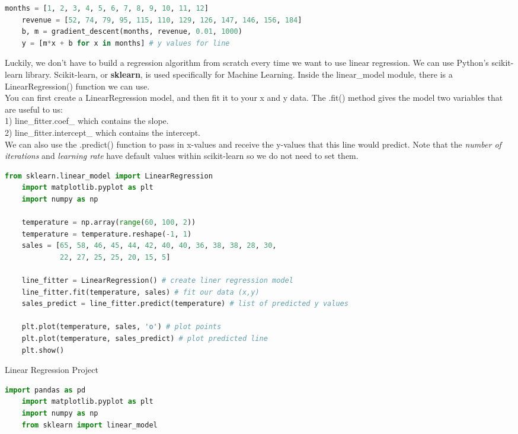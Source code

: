 \documentclass[11pt, a4paper]{article}
\begin{document}
\begin{spacing}{1.1}
\begin{lstlisting}[language=Python]
	months = [1, 2, 3, 4, 5, 6, 7, 8, 9, 10, 11, 12]
	revenue = [52, 74, 79, 95, 115, 110, 129, 126, 147, 146, 156, 184]
	b, m = gradient_descent(months, revenue, 0.01, 1000)
	y = [m*x + b for x in months] # y values for line \end{lstlisting} \newpage
	\noindent Luckily, we don’t have to build a regression algorithm from scratch every time we want to use linear regression. We can use Python’s scikit-learn library. Scikit-learn, or \textbf{sklearn}, is used specifically for Machine Learning. Inside the linear\_model module, there is a LinearRegression() function we can use. \vspace*{1mm} \\
	You can first create a LinearRegression model, and then fit it to your x and y data. The .fit() method gives the model two variables that are useful to us: \vspace*{.5mm} \\	
	\hspace*{2mm} 1) line\_fitter.coef\_ which contains the slope. \\
	\hspace*{2mm} 2) line\_fitter.intercept\_ which contains the intercept. \vspace*{1.5mm} \\
	We can also use the .predict() function to pass in x-values and receive the y-values that this line would predict. Note that the \textit{number of iterations} and \textit{learning rate} have default values within scikit-learn so we do not need to set them.
	\begin{lstlisting}[language=Python]
	from sklearn.linear_model import LinearRegression
	import matplotlib.pyplot as plt
	import numpy as np
	
	temperature = np.array(range(60, 100, 2))
	temperature = temperature.reshape(-1, 1)
	sales = [65, 58, 46, 45, 44, 42, 40, 40, 36, 38, 38, 28, 30, 
	         22, 27, 25, 25, 20, 15, 5]
	
	line_fitter = LinearRegression() # create liner regression model
	line_fitter.fit(temperature, sales) # fit our data (x,y)
	sales_predict = line_fitter.predict(temperature) # list of predicted y values
	
	plt.plot(temperature, sales, 'o') # plot points
	plt.plot(temperature, sales_predict) # plot predicted line
	plt.show() \end{lstlisting}\vspace*{1mm}
	Linear Regression Project 
	\begin{lstlisting}[language=Python]
	import pandas as pd
	import matplotlib.pyplot as plt
	import numpy as np
	from sklearn import linear_model
	

\end{lstlisting}
\end{spacing}
\end{document}
